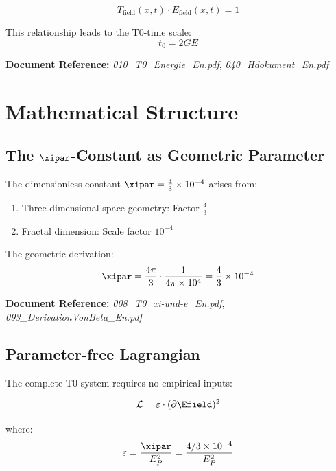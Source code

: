 \begin{equation}
	T_{\text{field}}(x,t) \cdot E_{\text{field}}(x,t) = 1
\end{equation}

This relationship leads to the T0-time scale:
\begin{equation}
	t_0 = 2GE
\end{equation}

\textbf{Document Reference:} \textit{010\_T0\_Energie\_En.pdf}, \textit{040\_Hdokument\_En.pdf}

\section{Mathematical Structure}

\subsection{The $\xipar$-Constant as Geometric Parameter}

The dimensionless constant $\xipar = \frac{4}{3} \times 10^{-4}$ arises from:

\begin{enumerate}
	\item Three-dimensional space geometry: Factor $\frac{4}{3}$
	\item Fractal dimension: Scale factor $10^{-4}$
\end{enumerate}

The geometric derivation:
\begin{equation}
	\xipar = \frac{4\pi}{3} \cdot \frac{1}{4\pi \times 10^4} = \frac{4}{3} \times 10^{-4}
\end{equation}

\textbf{Document Reference:} \textit{008\_T0\_xi-und-e\_En.pdf}, \textit{093\_DerivationVonBeta\_En.pdf}

\subsection{Parameter-free Lagrangian}

The complete T0-system requires no empirical inputs:

\begin{equation}
	\mathcal{L} = \varepsilon \cdot (\partial \Efield)^2
\end{equation}

where:
\begin{equation}
	\varepsilon = \frac{\xipar}{E_P^2} = \frac{4/3 \times 10^{-4}}{E_P^2}
\end{equation}

